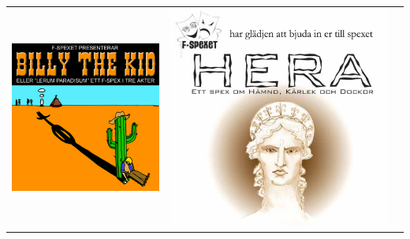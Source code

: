 \newlength{\gamlaAffischerLength}
\setlength{\gamlaAffischerLength}{0.28\textwidth}
\newlength{\gamlaAffischerHeight}
\setlength{\gamlaAffischerHeight}{0.32\textwidth}
\vfill
\begin{tabular}{c c c}
\includegraphics[width=\gamlaAffischerLength]{Bilder/TidigareSpexloggor/BillyIcon} &
\includegraphics[width=\gamlaAffischerLength]{Bilder/TidigareSpexloggor/HeraIcon} &

\end{tabular}
